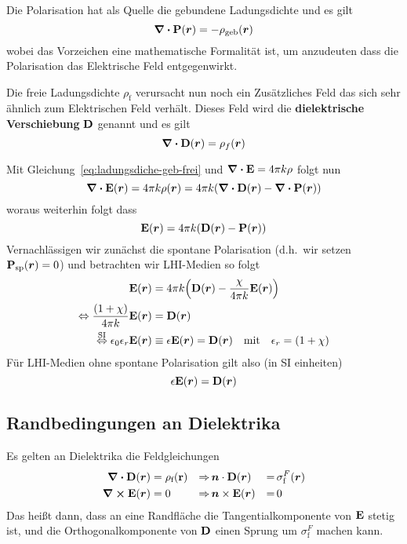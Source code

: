 Die Polarisation hat als Quelle die gebundene Ladungsdichte und es gilt
\begin{equation}
  \div \vb P(\vb*r) = -\rho_\text{geb}(\vb*r)
\end{equation}
wobei das Vorzeichen eine mathematische Formalität ist, um anzudeuten dass
die Polarisation das Elektrische Feld entgegenwirkt.

Die freie Ladungsdichte $\rho_\text{f}$ verursacht nun noch ein Zusätzliches
Feld das sich sehr ähnlich zum Elektrischen Feld verhält. Dieses Feld
wird die \textbf{dielektrische Verschiebung} $\vb D$ genannt und es gilt
\begin{equation}
  \div \vb D(\vb*r) = \rho_f(\vb*r)
\end{equation}

Mit Gleichung~\ref{eq:ladungsdiche-geb-frei} und $\div\vb E=4\pi k \rho$
folgt nun
\begin{equation*}
  \div \vb E(\vb*r) = 4\pi k \rho(\vb*r)=4\pi k(\div\vb D(\vb*r)-\div \vb P(\vb*r))
\end{equation*}
woraus weiterhin folgt dass
\begin{equation}
  \vb E(\vb*r) = 4\pi k (\vb D(\vb*r) - \vb P(\vb*r))
\end{equation}
Vernachlässigen wir zunächst die spontane Polarisation (d.h.\ wir setzen  
$\vb P_\text{sp}(\vb*r)=0$) und betrachten wir LHI-Medien so folgt
\begin{equation}
  \begin{split}
    \vb E(\vb*r) 
    &= 4\pi k \qty(\vb D(\vb*r) - \frac{\chi}{4\pi k} \vb E(\vb*r))\\
    \Leftrightarrow \frac{(1+\chi)}{4\pi k} \vb E(\vb*r) 
    &= \vb D(\vb*r)\\
    \stackrel{\text{SI}}{\Leftrightarrow} 
    \vb \epsilon_0\epsilon_r \vb E(\vb*r) 
    &\equiv 
    \epsilon \vb E(\vb*r)
    = \vb D(\vb*r) \quad \text{mit}\quad \epsilon_r = (1+\chi) \\
  \end{split}
\end{equation}
Für LHI-Medien ohne spontane Polarisation gilt also (in SI einheiten)
\begin{equation*}
  \epsilon \vb E(\vb*r) = \vb D(\vb*r) 
\end{equation*}

\subsection{Randbedingungen an Dielektrika}%
\label{sub:randbedingungen-an-dielektrika}
Es gelten an Dielektrika die Feldgleichungen
\begin{equation}
  \begin{aligned}
    \div \vb D(\vb*r) &= \rho_\text{f}(\vb r) 
                    & \Rightarrow \,
                    & \vb*n\cdot\vb D(\vb*r)
                    &=\,& \sigma^F_\text{f}(\vb*r)\\
    \curl \vb E(\vb*r) &= 0
                    & \Rightarrow \,
                    & \vb*n\times\vb E(\vb*r)
                    &=\,& 0
  \end{aligned}
\end{equation}
Das heißt dann, dass an eine Randfläche die 
Tangentialkomponente von $\vb E$ stetig ist, und
die Orthogonalkomponente von $\vb D$ einen Sprung um $\sigma^F_\text{f}$ 
machen kann.

